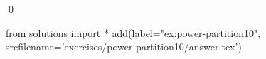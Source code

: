 
\begin{ex} 
  \label{ex:power-partition10}
  
  \qed
\end{ex} 
\begin{python0}
from solutions import *
add(label="ex:power-partition10",
    srcfilename='exercises/power-partition10/answer.tex') 
\end{python0}
